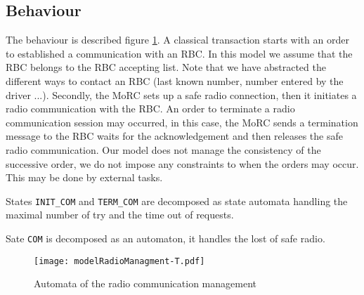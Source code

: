 \subsection{Behaviour}
\label{subsec:behavior}

The behaviour is described figure \ref{fig:behavior}.
A classical transaction starts with an order to established a communication with
an RBC. In this model we assume that the RBC belongs to the RBC accepting list.
Note that we have abstracted the different ways to contact an RBC (last known
number, number entered by the driver ...). Secondly, the MoRC sets up a safe radio
connection, then it initiates a radio communication with the RBC.
An order to terminate a radio communication session may occurred, in this case,
the MoRC sends a termination message to the RBC waits for the acknowledgement and
then releases the safe radio communication.
Our model does not manage the consistency of the successive order, we do not
impose any constraints to when the orders may occur. This may be done by external
tasks.

States \verb+INIT_COM+ and \verb+TERM_COM+ are decomposed as state automata
handling the maximal number of try and the time out of requests.

Sate \verb+COM+ is decomposed as an automaton, it handles the lost of safe
radio.
\begin{figure}[htpb]
\centering
\texttt{[image: modelRadioManagment-T.pdf]}
\caption{\label{fig:behavior}Automata of the radio communication management}
\end{figure}

